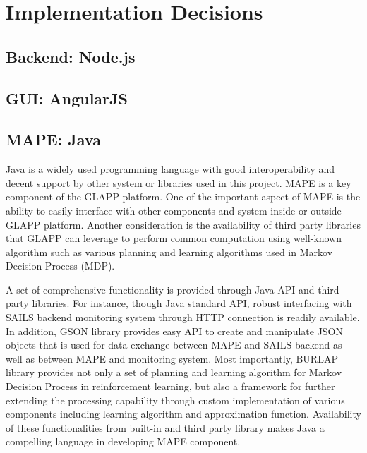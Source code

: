 \documentclass{seal_thesis}
\begin{document}
\section{Implementation Decisions}
\subsection{Backend: Node.js}

\subsection{GUI: AngularJS}

\subsection{MAPE: Java}
Java is a widely used programming language with good interoperability and decent support by other system or libraries used in this project.
MAPE is a key component of the GLAPP platform.
One of the important aspect of MAPE is the ability to easily interface with other components and system inside or outside GLAPP platform.
Another consideration is the availability of third party libraries that GLAPP can leverage to perform common computation using well-known algorithm such as various planning and learning algorithms used in Markov Decision Process (MDP).

A set of comprehensive functionality is provided through Java API and third party libraries.
For instance, though Java standard API, robust interfacing with SAILS backend monitoring system through HTTP connection is readily available.
In addition, GSON library  provides easy API to create and manipulate JSON objects that is used for data exchange between MAPE and SAILS backend as well as between MAPE and monitoring system.
Most importantly, BURLAP library  provides not only a set of planning and learning algorithm for Markov Decision Process in reinforcement learning, but also a framework for further extending the processing capability through custom implementation of various components including learning algorithm and approximation function.
Availability of these functionalities from built-in and third party library makes Java a compelling language in developing MAPE component.
\end{document}
